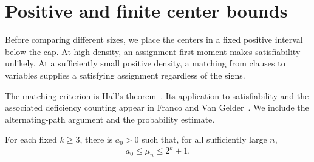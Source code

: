 \section{Positive and finite center bounds}\label{sec:anchors}

Before comparing different sizes, we place the centers in a fixed
positive interval below the cap. At high density, an assignment first
moment makes satisfiability unlikely. At a sufficiently small positive
density, a matching from clauses to variables supplies a satisfying
assignment regardless of the signs.

The matching criterion is Hall's theorem~\cite{Hall}. Its application
to satisfiability and the associated deficiency counting appear in
Franco and Van Gelder~\cite[Section~8]{FV}. We include the
alternating-path argument and the probability estimate.

\begin{lemma}\label{lem:center-bounds}
For each fixed \(k\ge3\), there is \(a_0>0\) such that, for all
sufficiently large \(n\),
\[
 a_0\le\mu_n\le2^k+1.
\]
\end{lemma}


